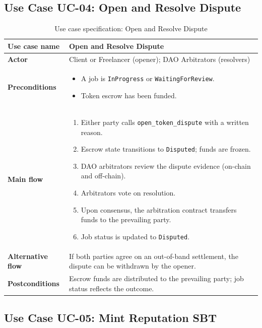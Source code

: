 \subsection{Use Case UC-04: Open and Resolve Dispute}
\label{subsection:uc04}

\begin{table}[H]
\centering
\caption{Use case specification: Open and Resolve Dispute}
\label{table:uc04}
\begin{tabular}{|l|p{10cm}|}
\hline
\textbf{Use case name} & Open and Resolve Dispute \\ \hline
\textbf{Actor} & Client or Freelancer (opener); DAO Arbitrators (resolvers) \\ \hline
\textbf{Preconditions} & \begin{itemize}[noitemsep]
    \item A job is \texttt{InProgress} or \texttt{WaitingForReview}.
    \item Token escrow has been funded.
\end{itemize} \\ \hline
\textbf{Main flow} & \begin{enumerate}[noitemsep]
    \item Either party calls \texttt{open\_token\_dispute} with a written reason.
    \item Escrow state transitions to \texttt{Disputed}; funds are frozen.
    \item DAO arbitrators review the dispute evidence (on-chain and off-chain).
    \item Arbitrators vote on resolution.
    \item Upon consensus, the arbitration contract transfers funds to the prevailing party.
    \item Job status is updated to \texttt{Disputed}.
\end{enumerate} \\ \hline
\textbf{Alternative flow} & If both parties agree on an out-of-band settlement, the dispute can be withdrawn by the opener. \\ \hline
\textbf{Postconditions} & Escrow funds are distributed to the prevailing party; job status reflects the outcome. \\ \hline
\end{tabular}
\end{table}

\subsection{Use Case UC-05: Mint Reputation SBT}
\label{subsection:uc05}

